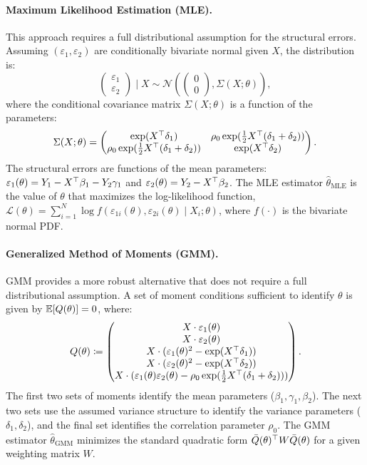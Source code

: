\paragraph{Maximum Likelihood Estimation (MLE).}
This approach requires a full distributional assumption for the structural errors. Assuming $(\varepsilon_1, \varepsilon_2)$ are conditionally bivariate normal given $X$, the distribution is:
\[
\begin{pmatrix} \varepsilon_1 \\ \varepsilon_2 \end{pmatrix} \mid X \sim \mathcal{N} \left( \begin{pmatrix} 0 \\ 0 \end{pmatrix}, \Sigma(X; \theta) \right),
\]
where the conditional covariance matrix $\Sigma(X; \theta)$ is a function of the parameters:
\[
\Sigma(X; \theta) = \begin{pmatrix}
\exp(X^{\top}\delta_1) & \rho_0 \exp(\frac{1}{2}X^{\top}(\delta_1+\delta_2)) \\
\rho_0 \exp(\frac{1}{2}X^{\top}(\delta_1+\delta_2)) & \exp(X^{\top}\delta_2)
\end{pmatrix}.
\]
The structural errors are functions of the mean parameters: $\varepsilon_1(\theta) = Y_1 - X^{\top}\beta_1 - Y_2\gamma_1$ and $\varepsilon_2(\theta) = Y_2 - X^{\top}\beta_2$. The MLE estimator $\hat{\theta}_{\text{MLE}}$ is the value of $\theta$ that maximizes the log-likelihood function, $\mathcal{L}(\theta) = \sum_{i=1}^N \log f(\varepsilon_{1i}(\theta), \varepsilon_{2i}(\theta) \mid X_i; \theta)$, where $f(\cdot)$ is the bivariate normal PDF.

\paragraph{Generalized Method of Moments (GMM).}
GMM provides a more robust alternative that does not require a full distributional assumption. A set of moment conditions sufficient to identify $\theta$ is given by $\mathbb{E}[Q(\theta)]=0$, where:
\[
Q(\theta) \coloneqq \begin{pmatrix}
X \cdot \varepsilon_1(\theta) \\
X \cdot \varepsilon_2(\theta) \\
X \cdot (\varepsilon_1(\theta)^2 - \exp(X^{\top}\delta_1)) \\
X \cdot (\varepsilon_2(\theta)^2 - \exp(X^{\top}\delta_2)) \\
X \cdot (\varepsilon_1(\theta)\varepsilon_2(\theta) - \rho_0 \exp(\frac{1}{2}X^{\top}(\delta_1+\delta_2)))
\end{pmatrix}.
\]
The first two sets of moments identify the mean parameters ($\beta_1, \gamma_1, \beta_2$). The next two sets use the assumed variance structure to identify the variance parameters ($\delta_1, \delta_2$), and the final set identifies the correlation parameter $\rho_0$. The GMM estimator $\hat{\theta}_{\text{GMM}}$ minimizes the standard quadratic form $\bar{Q}(\theta)^{\top} W \bar{Q}(\theta)$ for a given weighting matrix $W$.


